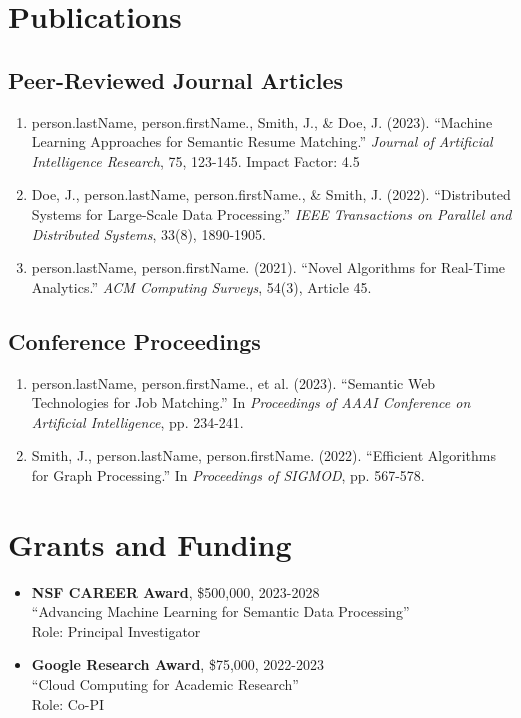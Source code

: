 \documentclass[11pt,a4paper]{article}
\begin{document}
\section{Publications}
\subsection{Peer-Reviewed Journal Articles}
\begin{enumerate}[leftmargin=*, topsep=0pt]
    \item {{person.lastName}}, {{person.firstName}}., Smith, J., \& Doe, J. (2023). 
    ``Machine Learning Approaches for Semantic Resume Matching.'' 
    \textit{Journal of Artificial Intelligence Research}, 75, 123-145.
    Impact Factor: 4.5
    
    \item Doe, J., {{person.lastName}}, {{person.firstName}}., \& Smith, J. (2022). 
    ``Distributed Systems for Large-Scale Data Processing.'' 
    \textit{IEEE Transactions on Parallel and Distributed Systems}, 33(8), 1890-1905.
    
    \item {{person.lastName}}, {{person.firstName}}. (2021). 
    ``Novel Algorithms for Real-Time Analytics.'' 
    \textit{ACM Computing Surveys}, 54(3), Article 45.
\end{enumerate}

\subsection{Conference Proceedings}
\begin{enumerate}[leftmargin=*, topsep=0pt]
    \item {{person.lastName}}, {{person.firstName}}., et al. (2023). 
    ``Semantic Web Technologies for Job Matching.'' 
    In \textit{Proceedings of AAAI Conference on Artificial Intelligence}, pp. 234-241.
    
    \item Smith, J., {{person.lastName}}, {{person.firstName}}. (2022). 
    ``Efficient Algorithms for Graph Processing.'' 
    In \textit{Proceedings of SIGMOD}, pp. 567-578.
\end{enumerate}

\section{Grants and Funding}
\begin{itemize}[leftmargin=*, topsep=0pt]
    \item \textbf{NSF CAREER Award}, \$500,000, 2023-2028\\
    ``Advancing Machine Learning for Semantic Data Processing''\\
    Role: Principal Investigator
    
    \item \textbf{Google Research Award}, \$75,000, 2022-2023\\
    ``Cloud Computing for Academic Research''\\
    Role: Co-PI
\end{itemize}
\end{document}
